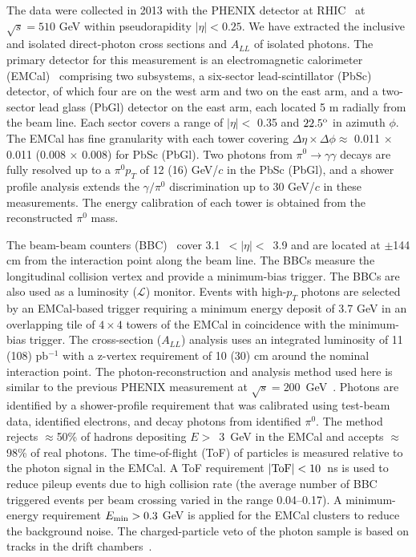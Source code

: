 \documentclass[twocolumn,letterpaper,aps,prl,longbibliography,superscriptaddress,floatfix]{revtex4-2}
\newcommand{\pT}{\mbox{$p_T$}\xspace}
\newcommand{\pizero}{\mbox{$\pi^0$}\xspace}
\newcommand{\ALL}{\mbox{$A_{LL}$}\xspace}
\begin{document}

The data were collected in 2013 with the PHENIX 
detector at RHIC~\cite{ADCOX2003469} at $\sqrt{s}=510$ GeV within 
pseudorapidity $|\eta|<0.25$. We have extracted the inclusive and 
isolated direct-photon cross sections and \ALL of isolated photons. The 
primary detector for this measurement is an electromagnetic calorimeter 
(EMCal)~\cite{APHECETCHE2003521} comprising two subsystems, a 
six-sector lead-scintillator (PbSc) detector, of which four are on the 
west arm and two on the east arm, and a two-sector lead glass (PbGl) 
detector on the east arm, each located 5 m radially from the beam line. 
Each sector covers a range of $|\eta| <$ 0.35 and $22.5^{\rm o}$ in 
azimuth $\phi$. The EMCal has fine granularity with each tower covering 
$\Delta\eta \times \Delta\phi \approx$ 0.011 $\times$ 0.011 (0.008 
$\times$ 0.008) for PbSc (PbGl). Two photons from $\pi^0 \rightarrow 
\gamma\gamma$ decays are fully resolved up to a \pizero \pT of 12 (16) 
GeV/$c$ in the PbSc (PbGl), and a shower profile analysis extends the 
$\gamma/\pi^0$ discrimination up to 30 GeV/$c$ in these measurements. 
The energy calibration of each tower is obtained from the reconstructed 
\pizero mass.

The beam-beam counters (BBC)~\cite{ALLEN2003549} cover \mbox{3.1 $<
|\eta| <$ 3.9} and are located at $\pm$144 cm from the interaction point 
along the beam line. The BBCs measure the longitudinal collision vertex 
and provide a minimum-bias trigger. The BBCs are also used as 
a luminosity ($\mathcal{L}$) monitor. Events with high-\pT photons are selected by an 
EMCal-based trigger requiring a minimum energy deposit of 3.7 GeV in an 
overlapping tile of $4{\times}4$ towers of the EMCal in coincidence with 
the minimum-bias trigger. The cross-section (\ALL) analysis uses an 
integrated luminosity of 11 (108) pb$^{-1}$ with a 
z-vertex requirement of 10 (30) cm around the nominal interaction point. 
The photon-reconstruction and analysis method used here is 
similar to the previous PHENIX measurement at 
$\sqrt{s}=200$~GeV~\cite{PhysRevLett.98.012002,PhysRevD.86.072008}. 
Photons are identified by a shower-profile requirement that was 
calibrated using test-beam data, identified electrons, and decay photons 
from identified \pizero. The method rejects $\approx$50\% of hadrons 
depositing \mbox{$E>$ 3 GeV} in the EMCal and accepts $\approx$98\% of 
real photons. The time-of-flight (ToF) of particles is measured relative 
to the photon signal in the EMCal.  A ToF requirement 
$|{\rm ToF}|<10$~ns is used to reduce pileup events due to high 
collision rate (the average number of BBC triggered events per beam 
crossing varied in the range 0.04--0.17). A minimum-energy requirement 
$E_{\rm min}>0.3$ GeV is applied for the EMCal clusters to reduce the 
background noise.  The charged-particle veto of the photon sample is 
based on tracks in the drift chambers~\cite{ADCOX2003489}.
\end{document}
